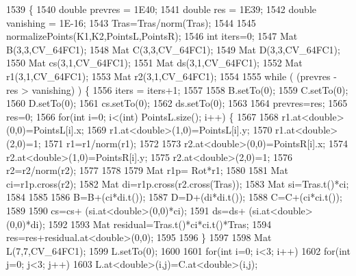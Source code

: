 \begin{DoxyCode}
1539                                                                                                            
              \{
1540     \textcolor{keywordtype}{double} prevres = 1E40;
1541     \textcolor{keywordtype}{double} res = 1E39;
1542     \textcolor{keywordtype}{double} vanishing = 1E-16;
1543     Tras=Tras/norm(Tras);
1544 
1545     normalizePoints(K1,K2,PointsL,PointsR);
1546     \textcolor{keywordtype}{int} iters=0;
1547     Mat B(3,3,CV\_64FC1);
1548     Mat C(3,3,CV\_64FC1);
1549     Mat D(3,3,CV\_64FC1);
1550     Mat cs(3,1,CV\_64FC1);
1551     Mat ds(3,1,CV\_64FC1);
1552     Mat r1(3,1,CV\_64FC1);
1553     Mat r2(3,1,CV\_64FC1);
1554 
1555     \textcolor{keywordflow}{while} ( (prevres  - res  >  vanishing) ) \{
1556         iters = iters+1;
1557         
1558         B.setTo(0);
1559         C.setTo(0);
1560         D.setTo(0);
1561         cs.setTo(0);
1562         ds.setTo(0);
1563        
1564         prevres=res;
1565         res=0;
1566         \textcolor{keywordflow}{for}(\textcolor{keywordtype}{int} i=0; i<(int) PointsL.size(); i++) \{
1567             
1568             r1.at<\textcolor{keywordtype}{double}>(0,0)=PointsL[i].x;
1569             r1.at<\textcolor{keywordtype}{double}>(1,0)=PointsL[i].y;
1570             r1.at<\textcolor{keywordtype}{double}>(2,0)=1;
1571             r1=r1/norm(r1);
1572 
1573             r2.at<\textcolor{keywordtype}{double}>(0,0)=PointsR[i].x;
1574             r2.at<\textcolor{keywordtype}{double}>(1,0)=PointsR[i].y;
1575             r2.at<\textcolor{keywordtype}{double}>(2,0)=1;
1576             r2=r2/norm(r2);
1577 
1578 
1579             Mat r1p= Rot*r1;
1580 
1581             Mat ci=r1p.cross(r2);
1582             Mat di=r1p.cross(r2.cross(Tras));
1583             Mat si=Tras.t()*ci;
1584 
1585           
1586             B=B+(ci*di.t());
1587             D=D+(di*di.t());
1588             C=C+(ci*ci.t());
1589             
1590             cs=cs+ (si.at<\textcolor{keywordtype}{double}>(0,0)*ci);
1591             ds=ds+ (si.at<\textcolor{keywordtype}{double}>(0,0)*di);
1592 
1593             Mat residual=Tras.t()*ci*ci.t()*Tras;
1594             res=res+residual.at<\textcolor{keywordtype}{double}>(0,0);
1595 
1596         \}
1597 
1598         Mat L(7,7,CV\_64FC1);
1599         L.setTo(0);
1600         
1601         \textcolor{keywordflow}{for}(\textcolor{keywordtype}{int} i=0; i<3; i++)
1602             \textcolor{keywordflow}{for}(\textcolor{keywordtype}{int} j=0; j<3; j++)
1603                 L.at<\textcolor{keywordtype}{double}>(i,j)=C.at<\textcolor{keywordtype}{double}>(i,j);

\end{DoxyCode}
